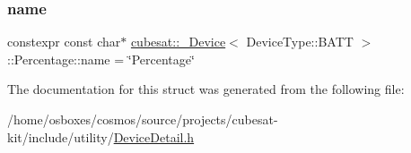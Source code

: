 \subsubsection{\texorpdfstring{name}{name}}
{\footnotesize\ttfamily constexpr const char$\ast$ \hyperlink{structcubesat_1_1__Device}{cubesat\+::\+\_\+\+Device}$<$ Device\+Type\+::\+B\+A\+TT $>$\+::Percentage\+::name = \char`\"{}Percentage\char`\"{}\hspace{0.3cm}{\ttfamily [static]}}



The documentation for this struct was generated from the following file\+:\begin{DoxyCompactItemize}
\item 
/home/osboxes/cosmos/source/projects/cubesat-\/kit/include/utility/\hyperlink{DeviceDetail_8h}{Device\+Detail.\+h}\end{DoxyCompactItemize}

